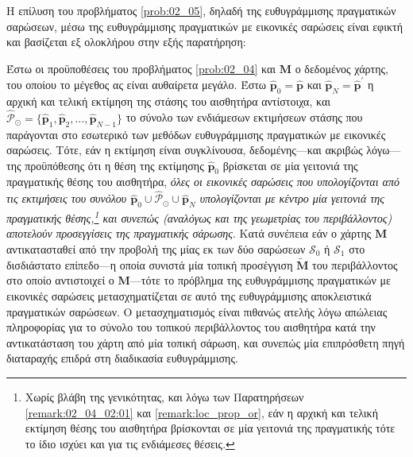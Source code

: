 Η επίλυση του προβλήματος \ref{prob:02_05}, δηλαδή της ευθυγράμμισης
πραγματικών σαρώσεων, μέσω της ευθυγράμμισης πραγματικών με εικονικές σαρώσεις
είναι εφικτή και βασίζεται εξ ολοκλήρου στην εξής παρατήρηση:

\begin{gg_box}
\begin{remark}
Έστω οι προϋποθέσεις του προβλήματος \ref{prob:02_04} και $\bm{M}$ ο δεδομένος
χάρτης, του οποίου το μέγεθος ας είναι αυθαίρετα μεγάλο. Έστω $\hat{\bm{p}}_0 =
\hat{\bm{p}}$ και $\hat{\bm{p}}_N = \hat{\bm{p}}^\prime$ η αρχική και τελική
εκτίμηση της στάσης του αισθητήρα αντίστοιχα, και $\hat{\mathcal{P}}_\odot =
\{\hat{\bm{p}}_1, \hat{\bm{p}}_2,\dots, \hat{\bm{p}}_{N-1}\}$ το σύνολο των
ενδιάμεσων εκτιμήσεων στάσης που παράγονται στο εσωτερικό των μεθόδων
ευθυγράμμισης πραγματικών με εικονικές σαρώσεις. Τότε, εάν η εκτίμηση
είναι συγκλίνουσα, δεδομένης---και ακριβώς λόγω---της προϋπόθεσης ότι η θέση
της εκτίμησης $\hat{\bm{p}}_0$ βρίσκεται σε μία γειτονιά της πραγματικής θέσης
του αισθητήρα, \textit{όλες οι εικονικές σαρώσεις που υπολογίζονται από τις
εκτιμήσεις του συνόλου $\hat{\bm{p}}_0 \cup \hat{\mathcal{P}}_\odot \cup
\hat{\bm{p}}_N$ υπολογίζονται με κέντρο μία γειτονιά της πραγματικής
θέσης,\footnote{Χωρίς βλάβη της γενικότητας, και λόγω των Παρατηρήσεων
\ref{remark:02_04_02:01} και \ref{remark:loc_prop_or}, εάν η αρχική και τελική
εκτίμηση θέσης του αισθητήρα βρίσκονται σε μία γειτονιά της πραγματικής τότε
το ίδιο ισχύει και για τις ενδιάμεσες θέσεις.} και συνεπώς (αναλόγως και της
γεωμετρίας του περιβάλλοντος) αποτελούν προσεγγίσεις της πραγματικής σάρωσης}.
Κατά συνέπεια εάν ο χάρτης $\bm{M}$ αντικατασταθεί από την προβολή της
μίας εκ των δύο σαρώσεων $\mathcal{S}_0$ ή $\mathcal{S}_1$ στο δισδιάστατο
επίπεδο---η οποία συνιστά μία τοπική προσέγγιση $\widetilde{\bm{M}}$ του
περιβάλλοντος στο οποίο αντιστοιχεί ο $\bm{M}$---τότε το πρόβλημα της
ευθυγράμμισης πραγματικών με εικονικές σαρώσεις μετασχηματίζεται σε αυτό της
ευθυγράμμισης αποκλειστικά πραγματικών σαρώσεων. Ο μετασχηματισμός είναι
πιθανώς ατελής λόγω απώλειας πληροφορίας για το σύνολο του τοπικού περιβάλλοντος
του αισθητήρα κατά την αντικατάσταση του χάρτη από μία τοπική σάρωση, και
συνεπώς μία επιπρόσθετη πηγή διαταραχής επιδρά στη διαδικασία ευθυγράμμισης.
\end{remark}
\end{gg_box}

